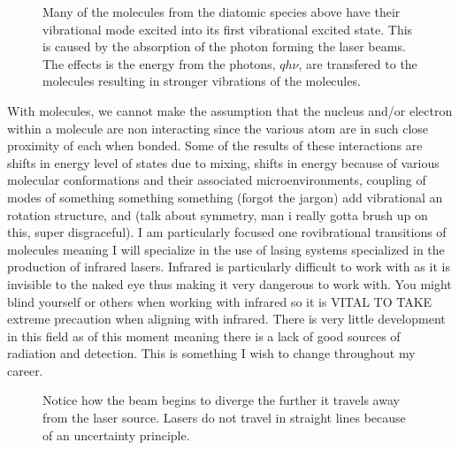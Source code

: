 \documentclass[a4paper]{book}
\newcommand{\imginput}[1]{} %
\begin{document}
	\begin{figure} [!ht]
		\centering
		\def\svgwidth{\columnwidth}
		\resizebox{15cm}{!}{\imginput{images/abs-rovib-trans.pdf_tex}}
		\caption{Many of the molecules from the  diatomic species above have their vibrational mode  excited into its first vibrational excited state. This is caused by the absorption of the photon forming the laser beams. The effects is the energy from the photons, $qh\nu$, are transfered to the molecules resulting in stronger vibrations of the molecules.}
		\label{fig:abs-rovib-trans}
	\end{figure}	
	
	With molecules, we cannot make the assumption that the nucleus and/or electron within a molecule are non interacting since the various atom are in such close proximity of each when bonded. Some of the results of these interactions are shifts in energy level of states due to mixing, shifts in energy because of various molecular conformations and their associated microenvironments, coupling of modes of something something something (forgot the jargon) add vibrational an rotation structure, and (talk about symmetry, man i really gotta brush up on this, super disgraceful). I am particularly focused one rovibrational transitions of molecules meaning I will specialize in the use of lasing systems specialized in the production of infrared lasers. Infrared is particularly difficult to work with as it is invisible to the naked eye thus making it very dangerous to work with. You might blind yourself or others when working with infrared so it is VITAL TO TAKE extreme precaution when aligning with infrared. There is very little development in this field as of this moment meaning there is a lack of good sources of radiation and detection. This is something I wish to change throughout my career.
	
	\begin{figure} [!ht]
		\centering
		\def\svgwidth{\columnwidth}
		\Huge
		\resizebox{10cm}{!}{\imginput{images/laser-gaussian-beam.pdf_tex}}
		\caption{Notice how the beam begins to diverge the further it travels away from the laser source. Lasers do not travel in straight lines because of an uncertainty principle.}
		\label{fig:laser-gaussian-beam}
	\end{figure}
	
\end{document}
